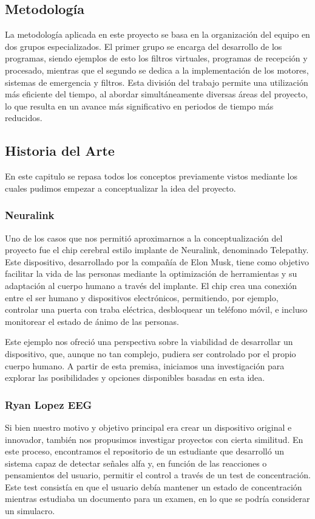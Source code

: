 \documentclass{article}
\begin{document}
\subsection{Metodología}
La metodología aplicada en este proyecto se basa en la organización del equipo en dos grupos especializados. El primer grupo se encarga del desarrollo de los programas, siendo ejemplos de esto los filtros virtuales, programas de recepción y procesado, mientras que el segundo se dedica a la implementación de los motores, sistemas de emergencia y filtros. Esta división del trabajo permite una utilización más eficiente del tiempo, al abordar simultáneamente diversas áreas del proyecto, lo que resulta en un avance más significativo en periodos de tiempo más reducidos.


\subsection{Historia del Arte}
En este capitulo se repasa todos los conceptos previamente vistos mediante los cuales pudimos empezar a conceptualizar la idea del proyecto.

\subsubsection{Neuralink}
Uno de los casos que nos permitió aproximarnos a la conceptualización del proyecto fue el chip cerebral estilo implante de Neuralink, denominado Telepathy. Este dispositivo, desarrollado por la compañía de Elon Musk, tiene como objetivo facilitar la vida de las personas mediante la optimización de herramientas y su adaptación al cuerpo humano a través del implante. El chip crea una conexión entre el ser humano y dispositivos electrónicos, permitiendo, por ejemplo, controlar una puerta con traba eléctrica, desbloquear un teléfono móvil, e incluso monitorear el estado de ánimo de las personas.


Este ejemplo nos ofreció una perspectiva sobre la viabilidad de desarrollar un dispositivo, que, aunque no tan complejo, pudiera ser controlado por el propio cuerpo humano. A partir de esta premisa, iniciamos una investigación para explorar las posibilidades y opciones disponibles basadas en esta idea.


\subsubsection{Ryan Lopez EEG}
Si bien nuestro motivo y objetivo principal era crear un dispositivo original e innovador, también nos propusimos investigar proyectos con cierta similitud. En este proceso, encontramos el repositorio de un estudiante que desarrolló un sistema capaz de detectar señales alfa y, en función de las reacciones o pensamientos del usuario, permitir el control a través de un test de concentración. Este test consistía en que el usuario debía mantener un estado de concentración mientras estudiaba un documento para un examen, en lo que se podría considerar un simulacro.
\end{document}
